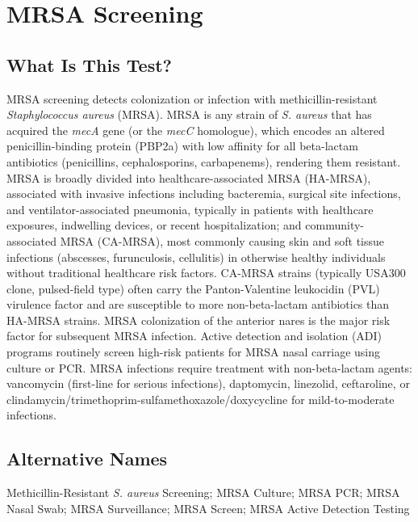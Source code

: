 \chapter{MRSA Screening}

\section*{What Is This Test?}
MRSA screening detects colonization or infection with methicillin-resistant \textit{Staphylococcus aureus} (MRSA). MRSA is any strain of \textit{S. aureus} that has acquired the \textit{mecA} gene (or the \textit{mecC} homologue), which encodes an altered penicillin-binding protein (PBP2a) with low affinity for all beta-lactam antibiotics (penicillins, cephalosporins, carbapenems), rendering them resistant. MRSA is broadly divided into healthcare-associated MRSA (HA-MRSA), associated with invasive infections including bacteremia, surgical site infections, and ventilator-associated pneumonia, typically in patients with healthcare exposures, indwelling devices, or recent hospitalization; and community-associated MRSA (CA-MRSA), most commonly causing skin and soft tissue infections (abscesses, furunculosis, cellulitis) in otherwise healthy individuals without traditional healthcare risk factors. CA-MRSA strains (typically USA300 clone, pulsed-field type) often carry the Panton-Valentine leukocidin (PVL) virulence factor and are susceptible to more non-beta-lactam antibiotics than HA-MRSA strains. MRSA colonization of the anterior nares is the major risk factor for subsequent MRSA infection. Active detection and isolation (ADI) programs routinely screen high-risk patients for MRSA nasal carriage using culture or PCR. MRSA infections require treatment with non-beta-lactam agents: vancomycin (first-line for serious infections), daptomycin, linezolid, ceftaroline, or clindamycin/trimethoprim-sulfamethoxazole/doxycycline for mild-to-moderate infections.

\section*{Alternative Names}
Methicillin-Resistant \textit{S. aureus} Screening; MRSA Culture; MRSA PCR; MRSA Nasal Swab; MRSA Surveillance; MRSA Screen; MRSA Active Detection Testing

